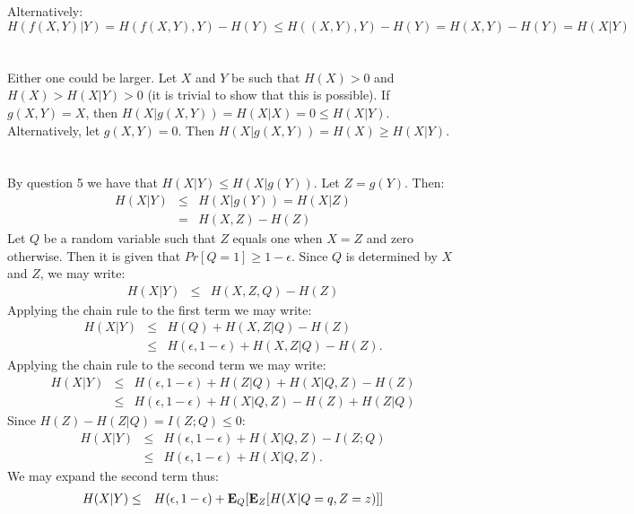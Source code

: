 \documentclass[11pt]{article} \usepackage{amssymb}
\newcommand{\E}{{\bf E}} \newcommand{\Cov}{{\bf Cov}}
\begin{document}
Alternatively:
\begin{equation*}
  H(f(X,Y)|Y) = H(f(X,Y),Y) - H(Y) \leq H((X,Y),Y) - H(Y) = H(X,Y)-H(Y)=H(X|Y)
\end{equation*}

\section{}
Either one could be larger. Let $X$ and $Y$ be such that $H(X) > 0$
and $H(X) > H(X|Y) > 0$ (it is trivial to show that this is possible). 
If $g(X,Y)=X$, then $H(X|g(X,Y))=H(X|X) = 0 \leq H(X|Y)$.
Alternatively, let $g(X,Y)=0$. Then $H(X|g(X,Y))=H(X) \geq H(X|Y)$.

\section{}
By question 5 we have that $H(X|Y)\leq H(X|g(Y))$. Let $Z=g(Y)$. Then:
\begin{eqnarray*}
  H(X|Y)
  &\leq& H(X|g(Y))=H(X|Z)\\
  &=& H(X,Z)-H(Z)
\end{eqnarray*}
Let $Q$ be a random variable such that $Z$ equals one when $X=Z$ and zero 
otherwise. Then it is given that $Pr[Q=1]\geq 1-\epsilon$. Since $Q$ is 
determined by $X$ and $Z$, we may write:
\begin{eqnarray*}
  H(X|Y) 
  &\leq& H(X,Z,Q) - H(Z)
\end{eqnarray*}
Applying the chain rule to the first term we may write:
\begin{eqnarray*}
  H(X|Y) 
  &\leq& H(Q) + H(X,Z|Q) - H(Z)\\  
  &\leq& H(\epsilon,1-\epsilon) + H(X,Z|Q) - H(Z).
\end{eqnarray*}
Applying the chain rule to the second term we may write:
\begin{eqnarray*}
  H(X|Y) 
  &\leq& H(\epsilon,1-\epsilon) + H(Z|Q) + H(X|Q,Z) - H(Z)\\
  &\leq& H(\epsilon,1-\epsilon) + H(X|Q,Z) - H(Z) + H(Z|Q)
\end{eqnarray*}
Since $H(Z) - H(Z|Q) = I(Z;Q) \leq 0$:
\begin{eqnarray*}
  H(X|Y) 
  &\leq& H(\epsilon,1-\epsilon) + H(X|Q,Z) - I(Z;Q)\\
  &\leq& H(\epsilon,1-\epsilon) + H(X|Q,Z).
\end{eqnarray*}
We may expand the second term thus:
\begin{eqnarray*}
  H(X|Y) 
  &\leq& H(\epsilon,1-\epsilon) + \E_Q[\E_Z[H(X|Q=q,Z=z)]]
\end{eqnarray*}
\end{document}
